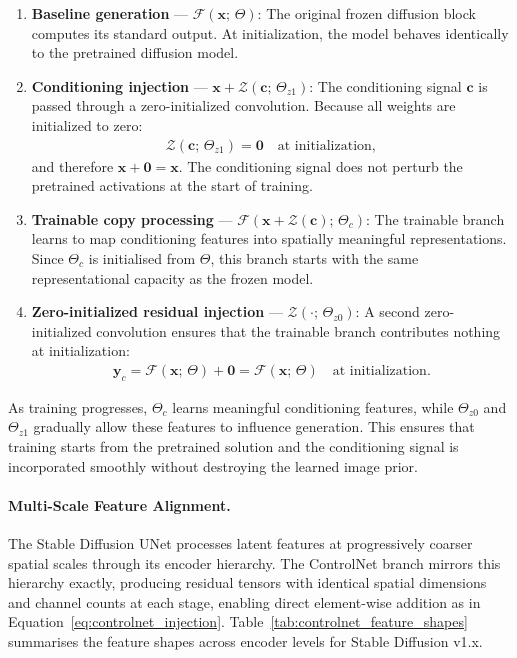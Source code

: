 \begin{enumerate}
    \item \textbf{Baseline generation} --- $\mathcal{F}(\mathbf{x};\, \Theta)$: The original frozen diffusion block computes its standard output. At initialization, the model behaves identically to the pretrained diffusion model.

    \item \textbf{Conditioning injection} --- $\mathbf{x} + \mathcal{Z}(\mathbf{c};\, \Theta_{z1})$: The conditioning signal $\mathbf{c}$ is passed through a zero-initialized convolution. Because all weights are initialized to zero:
    \begin{align}
        \mathcal{Z}(\mathbf{c};\, \Theta_{z1}) = \mathbf{0} \quad \text{at initialization},
        \label{eq:zero_init}
    \end{align}
    and therefore $\mathbf{x} + \mathbf{0} = \mathbf{x}$. The conditioning signal does not perturb the pretrained activations at the start of training.

    \item \textbf{Trainable copy processing} --- $\mathcal{F}(\mathbf{x} + \mathcal{Z}(\mathbf{c});\, \Theta_c)$: The trainable branch learns to map conditioning features into spatially meaningful representations. Since $\Theta_c$ is initialised from $\Theta$, this branch starts with the same representational capacity as the frozen model.

    \item \textbf{Zero-initialized residual injection} --- $\mathcal{Z}(\cdot;\, \Theta_{z0})$: A second zero-initialized convolution ensures that the trainable branch contributes nothing at initialization:
    \begin{align}
        \mathbf{y}_c = \mathcal{F}(\mathbf{x};\, \Theta) + \mathbf{0} = \mathcal{F}(\mathbf{x};\, \Theta) \quad \text{at initialization}.
        \label{eq:controlnet_init}
    \end{align}
\end{enumerate}

As training progresses, $\Theta_c$ learns meaningful conditioning features, while $\Theta_{z0}$ and $\Theta_{z1}$ gradually allow these features to influence generation. This ensures that training starts from the pretrained solution and the conditioning signal is incorporated smoothly without destroying the learned image prior.

\paragraph{Multi-Scale Feature Alignment.}
The Stable Diffusion UNet processes latent features at progressively coarser spatial scales through its encoder hierarchy. The ControlNet branch mirrors this hierarchy exactly, producing residual tensors with identical spatial dimensions and channel counts at each stage, enabling direct element-wise addition as in Equation~\eqref{eq:controlnet_injection}. Table~\ref{tab:controlnet_feature_shapes} summarises the feature shapes across encoder levels for Stable Diffusion v1.x.


